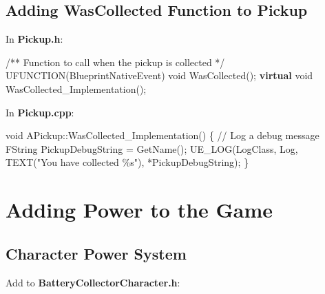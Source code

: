 \documentclass[
  letterpaper,
  DIV=11,
  numbers=noendperiod]{scrartcl}
\newenvironment{Shaded}{\begin{snugshade}}{\end{snugshade}}
\newcommand{\CommentTok}[1]{\textcolor[rgb]{0.37,0.37,0.37}{#1}}
\newcommand{\DataTypeTok}[1]{\textcolor[rgb]{0.68,0.00,0.00}{#1}}
\newcommand{\KeywordTok}[1]{\textcolor[rgb]{0.00,0.23,0.31}{\textbf{#1}}}
\newcommand{\NormalTok}[1]{\textcolor[rgb]{0.00,0.23,0.31}{#1}}
\newcommand{\OperatorTok}[1]{\textcolor[rgb]{0.37,0.37,0.37}{#1}}
\newcommand{\SpecialCharTok}[1]{\textcolor[rgb]{0.37,0.37,0.37}{#1}}
\newcommand{\StringTok}[1]{\textcolor[rgb]{0.13,0.47,0.30}{#1}}
\begin{document}
\subsection{Adding WasCollected Function to
Pickup}\label{adding-wascollected-function-to-pickup}

In \textbf{Pickup.h}:

\begin{Shaded}
\begin{Highlighting}[]
\CommentTok{/** Function to call when the pickup is collected */}
\NormalTok{UFUNCTION}\OperatorTok{(}\NormalTok{BlueprintNativeEvent}\OperatorTok{)}
\DataTypeTok{void}\NormalTok{ WasCollected}\OperatorTok{();}
\KeywordTok{virtual} \DataTypeTok{void}\NormalTok{ WasCollected\_Implementation}\OperatorTok{();}
\end{Highlighting}
\end{Shaded}

In \textbf{Pickup.cpp}:

\begin{Shaded}
\begin{Highlighting}[]
\DataTypeTok{void}\NormalTok{ APickup}\OperatorTok{::}\NormalTok{WasCollected\_Implementation}\OperatorTok{()}
\OperatorTok{\{}
    \CommentTok{// Log a debug message}
\NormalTok{    FString PickupDebugString }\OperatorTok{=}\NormalTok{ GetName}\OperatorTok{();}
\NormalTok{    UE\_LOG}\OperatorTok{(}\NormalTok{LogClass}\OperatorTok{,}\NormalTok{ Log}\OperatorTok{,}\NormalTok{ TEXT}\OperatorTok{(}\StringTok{"You have collected }\SpecialCharTok{\%s}\StringTok{"}\OperatorTok{),} \OperatorTok{*}\NormalTok{PickupDebugString}\OperatorTok{);}
\OperatorTok{\}}
\end{Highlighting}
\end{Shaded}

\section{Adding Power to the Game}\label{adding-power-to-the-game}

\subsection{Character Power System}\label{character-power-system}

Add to \textbf{BatteryCollectorCharacter.h}:
\end{document}
